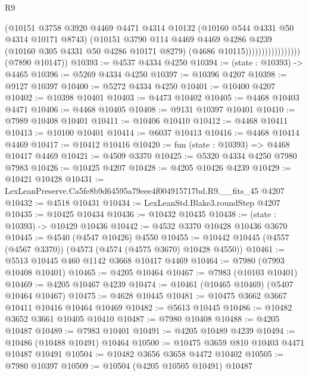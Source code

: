 \begin{lexlean}{R9}
\begin{coremodule}
                                  (@10151
                                    @3758
                                    @3920
                                    @4469
                                    @4471
                                    @4314
                                    @10132
                                    (@10160 @544 @4331 @50 @4314 @10171 @8743)
                                    (@10151
                                      @3790
                                      @114
                                      @4469
                                      @4469
                                      @4286
                                      @4239
                                      (@10160 @305 @4331 @50 @4286 @10171 @8279)
                                      (@4686 @10115)))))))))))))))))
      (@7890 @10147))
@10393 := @4537 @4334 @4250
@10394 := (state : @10393) -> @4465
@10396 := @5269 @4334 @4250
@10397 := @10396 @4207
@10398 := @9127 @10397
@10400 := @5272 @4334 @4250
@10401 := @10400 @4207
@10402 := @10398 @10401
@10403 := @4473 @10402
@10405 := @4468 @10403 @4471
@10406 := @4468 @10405
@10408 := @9131 @10397 @10401
@10410 := @7989 @10408 @10401
@10411 := @10406 @10410
@10412 := @4468 @10411
@10413 := @10100 @10401
@10414 := @6037 @10413
@10416 := @4468 @10414 @4469
@10417 := @10412 @10416
@10420 := fun (state : @10393) => @4468 @10417 @4469
@10421 := @4509 @3370
@10425 := @5320 @4334 @4250 @7980 @7983
@10426 := @10425 @4207
@10428 := @4205 @10426 @4239
@10429 := @10421 @10428
@10431 := LexLeanPreserve.Ca5fe8b9d64595a79eee4f004915717bd.R9.__fits_45 @4207
@10432 := @4518 @10431
@10434 := LexLeanStd.Blake3.roundStep @4207
@10435 := @10425 @10434
@10436 := @10432 @10435
@10438 := (state : @10393) -> @10429 @10436
@10442 := @4532 @3370 @10428 @10436 @3670
@10445 := @4540 (@4547 @10426) @4550
@10455 := @10442 @10445 (@4557 (@4567 @3370)) (@4573 (@4574 (@4575 @3670) @10428 @4550))
@10461 := @5513 @10445 @460 @1142 @3668 @10417 @4469
@10464 := @7980 (@7993 @10408 @10401)
@10465 := @4205 @10464
@10467 := @7983 (@10103 @10401)
@10469 := @4205 @10467 @4239
@10474 := @10461 (@10465 @10469) (@5407 @10464 @10467)
@10475 := @4628 @10445
@10481 := @10475 @3662 @3667 @10411 @10416 @10464 @10469
@10482 := @5613 @10445
@10486 := @10482 @3652 @3661 @10405 @10410
@10487 := @7980 @10408
@10488 := @4205 @10487
@10489 := @7983 @10401
@10491 := @4205 @10489 @4239
@10494 := @10486 (@10488 @10491) @10464
@10500 := @10475 @3659 @810 @10403 @4471 @10487 @10491
@10504 := @10482 @3656 @3658 @4472 @10402
@10505 := @7980 @10397
@10509 := @10504 (@4205 @10505 @10491) @10487

\end{coremodule}
\end{lexlean}
